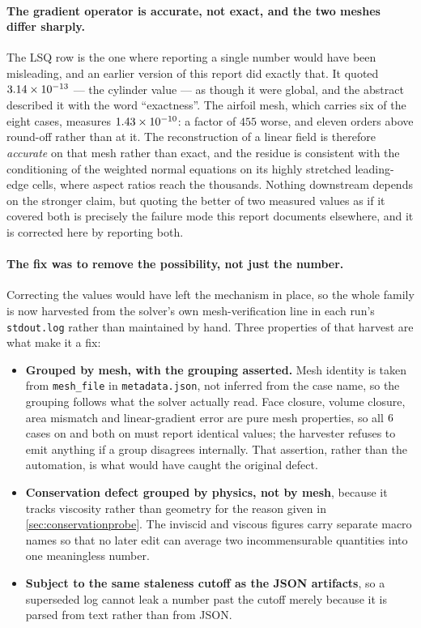 \paragraph{The gradient operator is accurate, not exact, and the two meshes differ
sharply.} The LSQ row is the one where reporting a single number would have been
misleading, and an earlier version of this report did exactly that. It quoted
$\num{3.14e-13}$ --- the cylinder value --- as though it were global, and the abstract
described it with the word ``exactness''. The airfoil mesh, which carries six of the eight
cases, measures $\num{1.43e-10}$: a factor of $455$ worse, and eleven orders above
round-off rather than at it. The reconstruction of a linear field is therefore
\emph{accurate} on that mesh rather than exact, and the residue is consistent with the
conditioning of the weighted normal equations on its highly stretched leading-edge cells,
where aspect ratios reach the thousands. Nothing downstream depends on the stronger claim,
but quoting the better of two measured values as if it covered both is precisely the
failure mode this report documents elsewhere, and it is corrected here by reporting both.

\paragraph{The fix was to remove the possibility, not just the number.} Correcting the
values would have left the mechanism in place, so the whole family is now harvested from
the solver's own mesh-verification line in each run's \texttt{stdout.log} rather than
maintained by hand. Three properties of that harvest are what make it a fix:

\begin{itemize}
  \item \textbf{Grouped by mesh, with the grouping asserted.} Mesh identity is taken from
  \texttt{mesh\_file} in \texttt{metadata.json}, not inferred from the case name, so the
  grouping follows what the solver actually read. Face closure, volume closure, area
  mismatch and linear-gradient error are pure mesh properties, so all
  $\num{6}$ cases on \texttt{\cnsMeshNameNaca} and both on
  \texttt{\cnsMeshNameCyl} must report identical values; the harvester refuses to emit
  anything if a group disagrees internally. That assertion, rather than the automation,
  is what would have caught the original defect.
  \item \textbf{Conservation defect grouped by physics, not by mesh}, because it tracks
  viscosity rather than geometry for the reason given in \cref{sec:conservationprobe}. The
  inviscid and viscous figures carry separate macro names so that no later edit can
  average two incommensurable quantities into one meaningless number.
  \item \textbf{Subject to the same staleness cutoff as the JSON artifacts}, so a
  superseded log cannot leak a number past the cutoff merely because it is parsed from
  text rather than from JSON.
\end{itemize}

